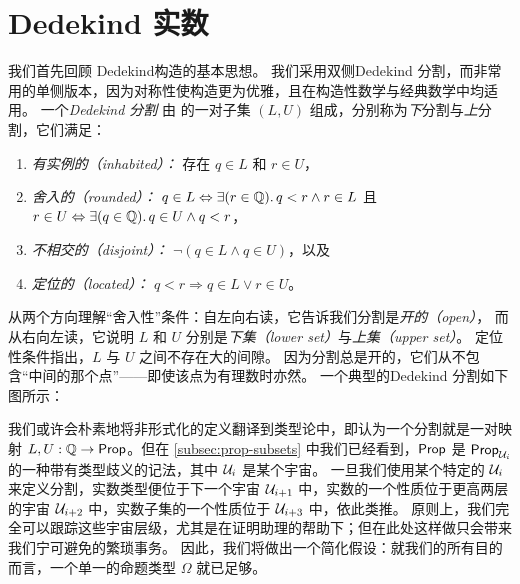 \section{Dedekind 实数}
\label{sec:dedekind-reals}

%
我们首先回顾 Dedekind构造的基本思想。
我们采用双侧Dedekind 分割，而非常用的单侧版本，因为对称性使构造更为优雅，且在构造性数学与经典数学中均适用。
%
一个\emph{Dedekind 分割} 由 \Q 的一对子集 $(L, U)$ 组成，分别称为\emph{下}分割与\emph{上}分割，它们满足：
%

\begin{enumerate}
\item \emph{有实例的（inhabited）：} 存在 $q \in L$ 和 $r \in U$，
\item \emph{舍入的（rounded）：} $q \in L \Leftrightarrow \exis {r \in \Q} q < r \land r \in L$
  且 $r \in U \Leftrightarrow \exis {q \in \Q} q \in U \land q < r$，
\item \emph{不相交的（disjoint）：} $\lnot (q \in L \land q \in U)$，以及
\item \emph{定位的（located）：} $q < r \Rightarrow q \in L \lor r \in U$。
\end{enumerate}

%
从两个方向理解``舍入性''条件：自左向右读，它告诉我们分割是\emph{开的（open）}，
%
而从右向左读，它说明 $L$ 和 $U$ 分别是\emph{下集（lower set）}与\emph{上集（upper set）}。
定位性条件指出，$L$ 与 $U$ 之间不存在大的间隙。
因为分割总是开的，它们从不包含``中间的那个点''——即使该点为有理数时亦然。
一个典型的Dedekind 分割如下图所示：
%

\begin{center}
\end{center}

%
我们或许会朴素地将非形式化的定义翻译到类型论中，即认为一个分割就是一对映射 $L, U : \mathbb{Q} \to \mathsf{Prop}$。但在 \cref{subsec:prop-subsets} 中我们已经看到，$\mathsf{Prop}$ 是 $\mathsf{Prop}_{\mathcal{U}_i}$ 的一种带有类型歧义的记法，其中 $\mathcal{U}_i$ 是某个宇宙。
一旦我们使用某个特定的 $\mathcal{U}_i$ 来定义分割，实数类型便位于下一个宇宙 $\mathcal{U}_{i+1}$ 中，实数的一个性质位于更高两层的宇宙 $\mathcal{U}_{i+2}$ 中，实数子集的一个性质位于 $\mathcal{U}_{i+3}$ 中，依此类推。
原则上，我们完全可以跟踪这些宇宙层级，尤其是在证明助理的帮助下；但在此处这样做只会带来我们宁可避免的繁琐事务。
因此，我们将做出一个简化假设：就我们的所有目的而言，一个单一的命题类型 $\Omega$ 就已足够。

